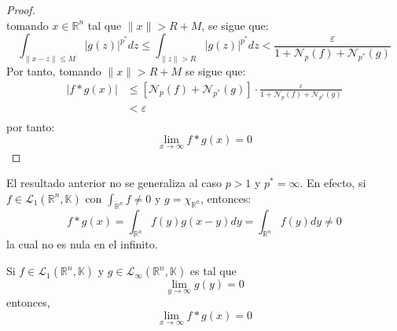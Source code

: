 \documentclass[12pt]{report}
\theoremstyle{largebreak}
\newcommand\abs[1]{\ensuremath{\big|#1\big|}}
\newcommand\norm[1]{\ensuremath{\|#1\|}}
\newcommand{\N}[2]{\ensuremath{\mathcal{N}_{#1}\left(#2\right)}}
\begin{document}
\begin{proof}
\begin{equation*}
        \end{equation*}
        tomando $x\in\mathbb{R}^n$ tal que $\norm{x}>R+M$, se sigue que:
        \begin{equation*}
            \int_{\norm{x-z}\leq M }\abs{g(z)}^{ p^*}dz\leq\int_{\norm{z}> R }\abs{g(z)}^{ p^*}dz<\frac{\varepsilon}{1+\N{p}{f}+\N{p^*}{g}}
        \end{equation*}
        Por tanto, tomando $\norm{x}>R+M$ se sigue que:
        \begin{equation*}
            \begin{split}
                \abs{f*g(x)}&\leq\left[\N{p}{f}+\N{p^*}{g} \right]\cdot\frac{\varepsilon}{1+\N{p}{f}+\N{p^*}{g}}\\
                &<\varepsilon\\
            \end{split}
        \end{equation*}
        por tanto:
        \begin{equation*}
            \lim_{x\rightarrow\infty}f*g(x)=0
        \end{equation*}
    \end{proof}

    \begin{obs}
        El resultado anterior no se generaliza al caso $p>1$ y $p^*=\infty$. En efecto, si $f\in\mathcal{L}_1(\mathbb{R}^n,\mathbb{K})$ con $\int_{\mathbb{R}^n}f\neq0$ y $g=\chi_{\mathbb{R}^n}$, entonces:
        \begin{equation*}
            f*g(x)=\int_{\mathbb{R}^n}f(y)g(x-y)dy=\int_{\mathbb{R}^n}f(y)dy\neq0
        \end{equation*}
        la cual no es nula en el infinito.
    \end{obs}

    \begin{propo}
        Si $f\in\mathcal{L}_1(\mathbb{R}^n,\mathbb{K})$ y $g\in\mathcal{L}_\infty(\mathbb{R}^n,\mathbb{K})$ es tal que
        \begin{equation*}
            \lim_{y\rightarrow\infty} g(y)=0
        \end{equation*}
        entonces,
        \begin{equation*}
            \lim_{x\rightarrow\infty} f*g(x)=0
        \end{equation*}
    \end{propo}
    
\end{document}
